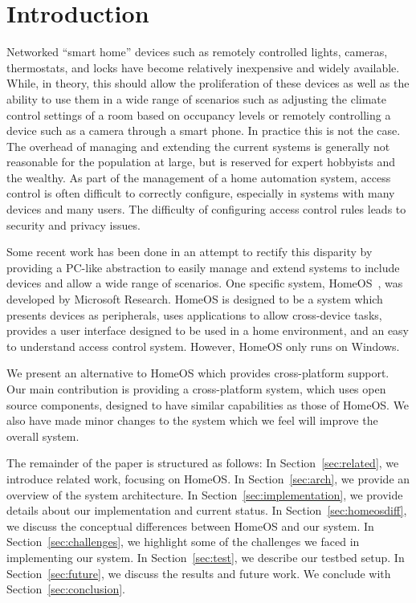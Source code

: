 \section{Introduction}
\label{sec:intro}
Networked ``smart home'' devices such as remotely controlled lights, cameras,
thermostats, and locks have become relatively inexpensive and widely available.
While, in theory, this should allow the proliferation of these devices as well
as the ability to use them in a wide range of scenarios such as adjusting the
climate control settings of a room based on occupancy levels or remotely
controlling a device such as a camera through a smart phone. In practice this is
not the case. The overhead of managing and extending the current systems is
generally not reasonable for the population at large, but is reserved for
expert hobbyists and the wealthy. As part of the management of a home automation
system, access control is often difficult to correctly configure, especially in
systems with many devices and many users. The difficulty of configuring access
control rules leads to security and privacy issues.

Some recent work has been done in an attempt to rectify this disparity by
providing a PC-like abstraction to easily manage and extend systems to include
devices and allow a wide range of scenarios. One specific system,
HomeOS~\cite{homeOS}, was developed by Microsoft Research. HomeOS is designed to
be a system which presents devices as peripherals, uses applications to allow
cross-device tasks, provides a user interface designed to be used in a home
environment, and an easy to understand access control system. However, HomeOS
only runs on Windows.

We present an alternative to HomeOS which provides cross-platform support. Our
main contribution is providing a cross-platform system, which uses open source
components, designed to have similar capabilities as those of HomeOS. We also
have made minor changes to the system which we feel will improve the overall
system.

The remainder of the paper is structured as follows: In
Section~\ref{sec:related}, we introduce related work, focusing on HomeOS. In
Section~\ref{sec:arch}, we provide an overview of the system architecture. In
Section~\ref{sec:implementation}, we provide details about our implementation
and current status. In Section~\ref{sec:homeosdiff}, we discuss the conceptual
differences between HomeOS and our system. In Section~\ref{sec:challenges}, we
highlight some of the challenges we faced in implementing our system. In
Section~\ref{sec:test}, we describe our testbed setup. In
Section~\ref{sec:future}, we discuss the results and future work. We conclude
with Section~\ref{sec:conclusion}.
